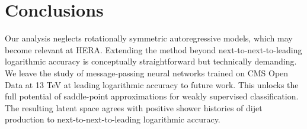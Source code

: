 \section{Conclusions}\label{sec:conclusions}

Our analysis neglects rotationally symmetric autoregressive models,
which may become relevant at HERA. Extending the method beyond
next-to-next-to-leading logarithmic accuracy is conceptually
straightforward but technically demanding. We leave the study of
message-passing neural networks trained on CMS Open Data at 13 TeV at
leading logarithmic accuracy to future work. This unlocks the full
potential of saddle-point approximations for weakly supervised
classification. The resulting latent space agrees with positive shower
histories of dijet production to next-to-next-to-leading logarithmic
accuracy.

